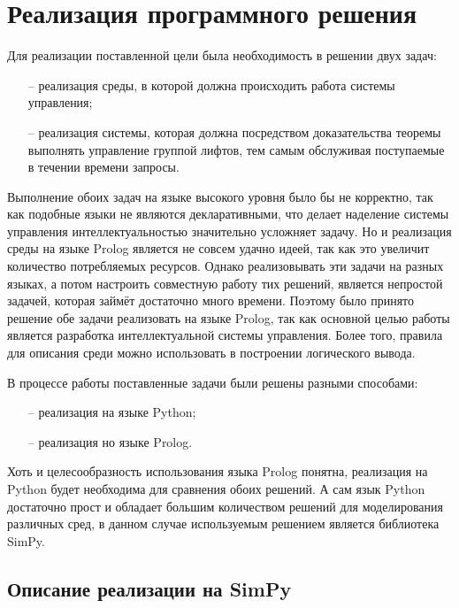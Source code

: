 \section{Реализация программного решения}

	Для реализации поставленной цели была необходимость в решении двух задач:
		\begin{itemize}
			\item[--] реализация среды, в которой должна происходить работа системы управления;
			\item[--] реализация системы, которая должна посредством доказательства теоремы выполнять
				управление группой лифтов, тем самым обслуживая поступаемые в течении времени запросы.
		\end{itemize}

	Выполнение обоих задач на языке высокого уровня было бы не корректно,
		так как подобные языки не являются декларативными,
		что делает наделение системы управления интеллектуальностью значительно усложняет задачу.
		Но и реализация среды на языке Prolog является не совсем удачно идеей,
		так как это увеличит количество потребляемых ресурсов.
		Однако реализовывать эти задачи на разных языках, а потом настроить совместную работу тих решений,
		является непростой задачей, которая займёт достаточно много времени.
		Поэтому было принято решение обе задачи реализовать на языке Prolog, так как основной
		целью работы является разработка интеллектуальной системы управления.
		Более того, правила для описания среди можно использовать в построении логического вывода.

	В процессе работы поставленные задачи были решены разными способами:
		\begin{itemize}
			\item[--] реализация на языке Python;
			\item[--] реализация но языке Prolog.
		\end{itemize}
	
	Хоть и целесообразность использования языка Prolog понятна, реализация на Python будет необходима для сравнения
	обоих решений. А сам язык Python достаточно прост и обладает большим количеством решений для моделирования
	различных сред, в данном случае используемым решением является библиотека SimPy.

	\subsection{Описание реализации на SimPy}

